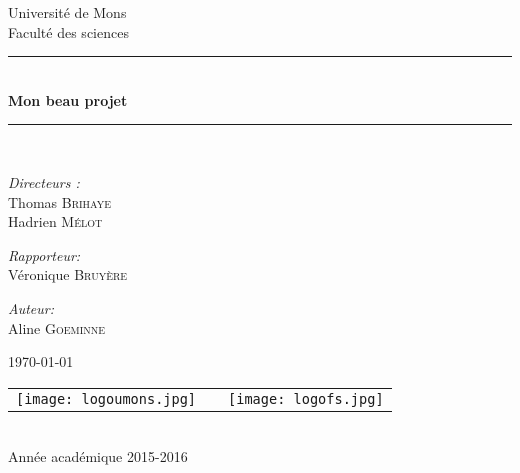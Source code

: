 \documentclass[]{article}
\theoremstyle{definition}
\theoremstyle{remark}
\theoremstyle{definition}
\theoremstyle{definition}
\begin{document}
\begin{titlepage}
\begin{center}

{\Large Université de Mons}\\[1ex]
{\Large Faculté des sciences}\\[2.5cm]

\newcommand{\HRule}{\rule{\linewidth}{0.3mm}}
\HRule \\[0.3cm]
{ \LARGE \bfseries Mon beau projet\\[0.3cm]}
\HRule \\[1.5cm]


\begin{center}
	\emph{Directeurs :}\\
	 Thomas \textsc{Brihaye} \\
	 Hadrien \textsc{Mélot}

\end{center}

\begin{center}
	\emph{Rapporteur:}\\
	Véronique \textsc{Bruyère}
\end{center}

\begin{center}
\emph{Auteur:} \\
Aline \textsc{Goeminne}
\end{center}
\vfill
\today
\vfill

\begin{center}
\begin{tabular}[t]{c c c}
\texttt{[image: logoumons.jpg]} &
\hspace{0.3cm} &
\texttt{[image: logofs.jpg]}
\end{tabular}
\end{center}~\\

{\large Année académique 2015-2016}

\end{center}
\end{titlepage}

\tableofcontents
\newpage

\newpage

\newpage

\newpage

\newpage




\newpage


\end{document}
